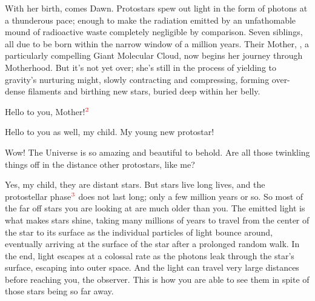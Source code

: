 \documentclass[main.tex]{subfiles}
\begin{document}
\par \nar With her birth, comes Dawn.  Protostars spew out light in the form of photons at a thunderous pace; enough to make the radiation emitted by an unfathomable mound of radioactive waste completely negligible by comparison.  Seven siblings, all due to be born within the narrow window of a million years. Their Mother, \rmpleione, a particularly compelling Giant Molecular Cloud, now begins her journey through Motherhood.  But it's not yet over; she's still in the process of yielding to gravity's nurturing might, slowly contracting and compressing, forming over-dense filaments and birthing new stars, buried deep within her belly.  


\par \Maia Hello to you, Mother!$^{\textcolor{red}{2}}$

\par \Pleione Hello to you as well, my child.  My young new protostar!

\par \Maia Wow!  The Universe is so amazing and beautiful to behold.  Are all those twinkling things off in the distance other protostars, like me?

\par \Pleione Yes, my child, they are distant stars.  But stars live long lives, and the protostellar phase$^{\textcolor{red}{3}}$ does not last long; only a few million years or so.  So most of the far off stars you are looking at are much older than you.  The emitted light is what makes stars shine, taking many millions of years to travel from the center of the star to its surface as the individual particles of light bounce around, eventually arriving at the surface of the star after a prolonged random walk.  In the end, light escapes at a colossal rate as the photons leak through the star's surface, escaping into outer space.  And the light can travel very large distances before reaching you, the observer.  This is how you are able to see them in spite of those stars being so far away.  
\end{document}
